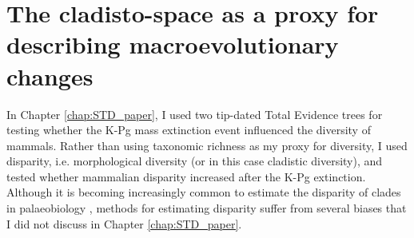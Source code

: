 \section{The cladisto-space as a proxy for describing macroevolutionary changes} %
In Chapter \ref{chap:STD_paper}, I used two tip-dated Total Evidence trees for testing whether the K-Pg mass extinction event influenced the diversity of mammals.
Rather than using taxonomic richness as my proxy for diversity, I used disparity, i.e. morphological diversity (or in this case cladistic diversity), and tested whether mammalian disparity increased after the K-Pg extinction.
Although it is becoming increasingly common to estimate the disparity of clades in palaeobiology \citep[e.g.]{Butler2012,brusattedinosaur2012,toljagictriassic-jurassic2013,brusattegradual2014,bensonfaunal2014,Claddis,Close2015}, methods for estimating disparity suffer from several biases that I did not discuss in Chapter \ref{chap:STD_paper}.

